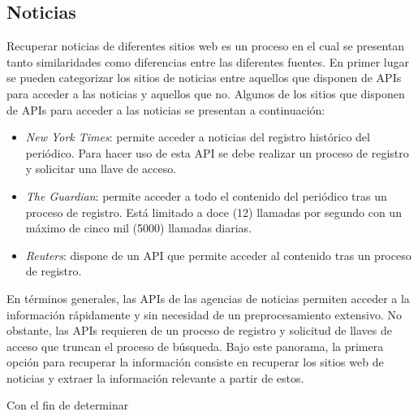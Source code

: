 \subsection{Noticias}
Recuperar noticias de diferentes sitios web es un proceso en el cual se presentan tanto similaridades como diferencias entre las diferentes fuentes. En primer lugar se pueden categorizar los sitios de noticias entre aquellos que disponen de APIs para acceder a las noticias y aquellos que no. Algunos de los sitios que disponen de APIs para acceder a las noticias se presentan a continuación:

\begin{itemize}
    \item \textit{New York Times}: permite acceder a noticias del registro histórico del periódico. Para hacer uso de esta API se debe realizar un proceso de registro y solicitar una llave de acceso.
    
    \item \textit{The Guardian}: permite acceder a todo el contenido del periódico tras un proceso de registro. Está limitado a doce (12) llamadas por segundo con un máximo de cinco mil (5000) llamadas diarias.
    
    \item \textit{Reuters}: dispone de un API que permite acceder al contenido tras un proceso de registro.
\end{itemize}

En términos generales, las APIs de las agencias de noticias permiten acceder a la información rápidamente y sin necesidad de un preprocesamiento extensivo. No obstante, las APIs requieren de un proceso de registro y solicitud de llaves de acceso que truncan el proceso de búsqueda. Bajo este panorama, la primera opción para recuperar la información consiste en recuperar los sitios web de noticias y extraer la información relevante a partir de estos. 

Con el fin de determinar 